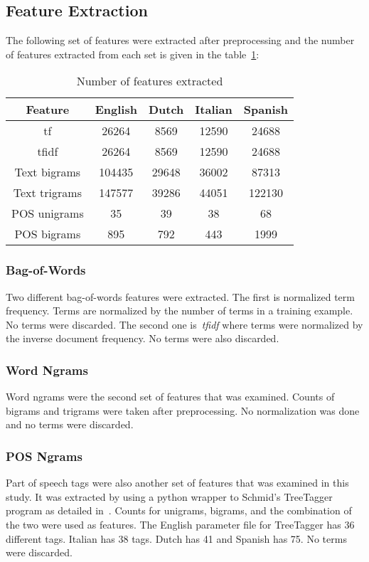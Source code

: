 \documentclass[a4paper]{llncs}
\begin{document}
\subsection{Feature Extraction}
The following set of features were extracted after preprocessing and the number of features extracted from each set is given in the table~\ref{table:numFeatures}: 

\begin{table}[!htbp]
  \centering
  \begin{tabular}{|c|cccc|}
    \hline
    Feature       & English & Dutch & Italian & Spanish \\ \hline
    tf            & 26264   & 8569  & 12590   & 24688   \\ %
    tfidf         & 26264   & 8569  & 12590   & 24688   \\ %
    Text bigrams  & 104435  & 29648 & 36002   & 87313   \\ %
    Text trigrams & 147577  & 39286 & 44051   & 122130  \\ %
    POS unigrams  & 35      & 39    & 38      & 68      \\ %
    POS bigrams   & 895     & 792   & 443     & 1999    \\ \hline
  \end{tabular}
  \caption{Number of features extracted}
  \label{table:numFeatures}
\end{table}

\subsubsection{Bag-of-Words}

Two different bag-of-words features were extracted. The first is normalized term frequency. Terms are normalized by the number of terms in a training example. No terms were discarded. The second one is~\textit{tfidf} where terms were normalized by the inverse document frequency. No terms were also discarded. 

\subsubsection{Word Ngrams}
Word ngrams were the second set of features that was examined. Counts of bigrams and trigrams were taken after preprocessing. No normalization was done and no terms were discarded. 

\subsubsection{POS Ngrams}
Part of speech tags were also another set of features that was examined in this study. It was extracted by using a python wrapper to Schmid's TreeTagger program as detailed in~\cite{schmid1994probabilistic}. Counts for unigrams, bigrams, and the combination of the two were used as features. The English parameter file for TreeTagger has 36 different tags. Italian has 38 tags. Dutch has 41 and Spanish has 75. No terms were discarded.
\end{document}
